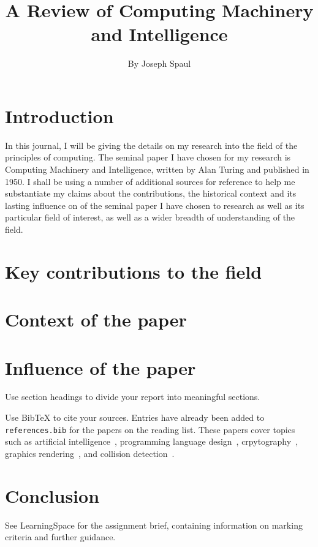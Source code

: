 \documentclass{article}
\title{A Review of Computing Machinery and Intelligence}
\author{By Joseph Spaul}
\begin{document}
\maketitle

\section{Introduction}

In this journal, I will be giving the details on my research into the field of the principles of computing. The seminal paper I have chosen for my research is Computing Machinery and Intelligence, written by Alan Turing and published in 1950. I shall be using a number of additional sources for reference to help me substantiate my claims about the contributions, the historical context and its lasting influence on of the seminal paper I have chosen to research as well as its particular field of interest, as well as a wider breadth of understanding of the field.

\section{Key contributions to the field}

\section{Context of the paper}

\section{Influence of the paper}

Use section headings to divide your report into meaningful sections.

Use BibTeX to cite your sources. Entries have already been added to \texttt{references.bib} for the papers on the reading list.
These papers cover topics such as artificial intelligence~\cite{turing1950_intelligence, knuth1975_alphabeta}, programming language design~\cite{dijkstra1968_goto}, crpytography~\cite{rivest1978_rsa}, graphics rendering~\cite{phong1975_illumination}, and collision detection~\cite{gilbert1988_gjk}.

\section{Conclusion}

See LearningSpace for the assignment brief, containing information on marking criteria and further guidance.
\end{document}
